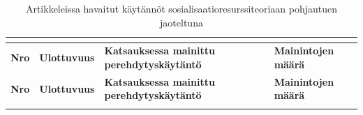 \documentclass[utf8]{gradu3}
\begin{document}
 \begin{scriptsize}
        \begin{longtable}[c]{llll}
        \multicolumn{4}{c}{}\\
            \hline
                \textbf{Nro} & \textbf{Ulottuvuus} \parencite{saks-gruman-2012} & \textbf{Katsauksessa mainittu perehdytyskäytäntö} & \textbf{Mainintojen määrä} \\
            \hline
        \endfirsthead
        \hline
            \hline
                \textbf{Nro} & \textbf{Ulottuvuus} \parencite{saks-gruman-2012} & \textbf{Katsauksessa mainittu perehdytyskäytäntö} & \textbf{Mainintojen määrä} \\
            \hline
        \endhead
     \hline
     
     \endfoot
    \caption{Artikkeleissa havaitut käytännöt sosialisaatioresurssiteoriaan \parencite{saks-gruman-2012} pohjautuen jaoteltuna \label{tbl:longtable-srt-ulottuvuudet-ja-niiden-kaytannot}}
    \endlastfoot
    

\end{longtable}
\end{scriptsize}
\end{document}
